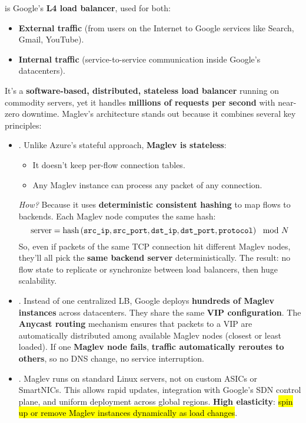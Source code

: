 \highspace
{} is Google's \textbf{L4 load balancer}, used for both:
\begin{itemize}
    \item \textbf{External traffic} (from users on the Internet to Google services like Search, Gmail, YouTube).
    \item \textbf{Internal traffic} (service-to-service communication inside Google's datacenters).
\end{itemize}
It's a \textbf{software-based, distributed, stateless load balancer} running on commodity servers, yet it handles \textbf{millions of requests per second} with near-zero downtime. Maglev's architecture stands out because it combines several key principles:
\begin{itemize}
    \item {}. Unlike Azure's stateful approach, \textbf{Maglev is stateless}:
    \begin{itemize}
        \item It doesn't keep per-flow connection tables.
        \item Any Maglev instance can process any packet of any connection.
    \end{itemize}
    \emph{How?} Because it uses \textbf{deterministic consistent hashing} to map flows to backends. Each Maglev node computes the same hash:
    \begin{equation*}
        \text{server} = \text{hash}\left(\texttt{src\_ip}, \texttt{src\_port}, \texttt{dst\_ip}, \texttt{dst\_port}, \texttt{protocol}\right) \mod N
    \end{equation*}
    So, even if packets of the same TCP connection hit different Maglev nodes, they'll all pick the \textbf{same backend server} deterministically. The result: no flow state to replicate or synchronize between load balancers, then huge scalability.


    \item {}. Instead of one centralized LB, Google deploys \textbf{hundreds of Maglev instances} across datacenters. They share the same \textbf{VIP configuration}. The \textbf{Anycast routing} mechanism ensures that packets to a VIP are automatically distributed among available Maglev nodes (closest or least loaded). If one \textbf{Maglev node fails}, \textbf{traffic automatically reroutes to others}, so no DNS change, no service interruption.


    \item {}. Maglev runs on standard Linux servers, not on custom ASICs or SmartNICs. This allows rapid updates, integration with Google's SDN control plane, and uniform deployment across global regions. \textbf{High elasticity}: \hl{spin up or remove Maglev instances dynamically as load changes}.



\end{itemize}
